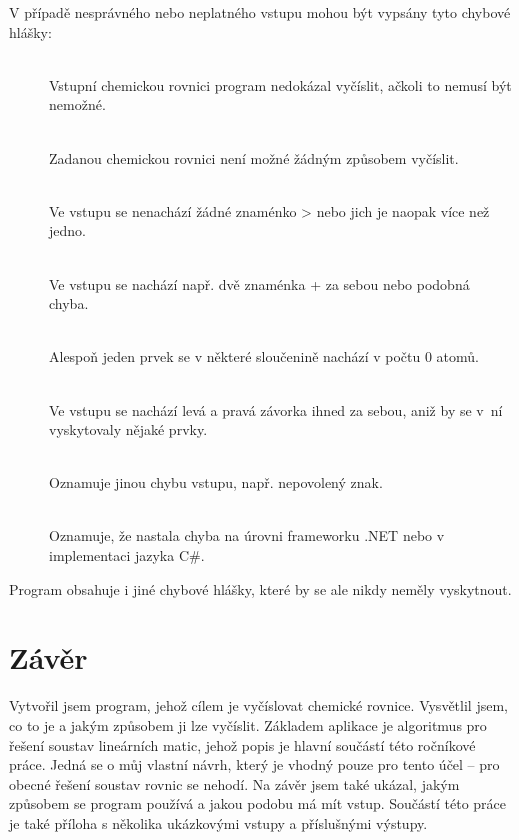 \documentclass[12pt,a4paper]{report}
\begin{document}
V případě nesprávného nebo neplatného vstupu mohou být vypsány tyto chybové hlášky:
\begin{description}
	\item[]~\\
	Vstupní chemickou rovnici program nedokázal vyčíslit, ačkoli to nemusí být nemožné.
	
	\item[]~\\
	Zadanou chemickou rovnici není možné žádným způsobem vyčíslit.
	
	\item[]~\\
	Ve vstupu se nenachází žádné znaménko > nebo jich je naopak více než jedno.
	
	\item[]~\\
	Ve vstupu se nachází např. dvě znaménka + za sebou nebo podobná chyba.
	
	\item[]~\\
	Alespoň jeden prvek se v některé sloučenině nachází v počtu 0 atomů.
	
	\item[]~\\
	Ve vstupu se nachází levá a pravá závorka ihned za sebou, aniž by se v~ní vyskytovaly nějaké prvky.
	
	\item[]~\\
	Oznamuje jinou chybu vstupu, např. nepovolený znak.
	
	\item[]~\\
	Oznamuje, že nastala chyba na úrovni frameworku .NET nebo v implementaci jazyka C\#.
\end{description} 
Program obsahuje i jiné chybové hlášky, které by se ale nikdy neměly vyskytnout.

\chapter{Závěr}
Vytvořil jsem program, jehož cílem je vyčíslovat chemické rovnice. Vysvětlil jsem, co to je a jakým způsobem ji lze vyčíslit. Základem aplikace je algoritmus pro řešení soustav lineárních matic, jehož popis je hlavní součástí této ročníkové práce. Jedná se o můj vlastní návrh, který je vhodný pouze pro tento účel -- pro obecné řešení soustav rovnic se nehodí. Na závěr jsem také ukázal, jakým způsobem se program používá a jakou podobu má mít vstup. Součástí této práce je také příloha s několika ukázkovými vstupy a příslušnými výstupy.
\end{document}
